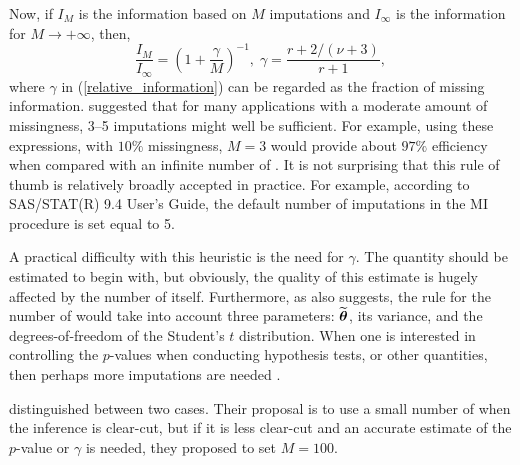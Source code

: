 \documentclass[11pt,a5paper,twoside]{book}
\newcommand{\bftheta}{\mbox{\boldmath $\theta$}}
\begin{document}
Now, if $I_M$ is the information based on $M$ imputations and $I_{\infty}$ is the information for $M\rightarrow+\infty$, then,
\begin{equation}
\label{relative_information}
\frac{I_M}{I_{\infty}} = \left( 1+ \frac{\gamma}{M} \right) ^{-1},\; \gamma=\frac{r+2/(\nu+3)}{r+1},
\end{equation}
where $\gamma$ in (\ref{relative_information}) can be regarded as the fraction of missing information. \cite{rubin1987} suggested that for many applications with a moderate amount of missingness, 3--5 imputations might well be sufficient. For example, using these expressions, with $10\%$ missingness, $M=3$ would provide about $97\%$ efficiency when compared with an infinite number of {\color{black}{imputed datasets}}. It is not surprising that this rule of thumb is relatively broadly accepted in practice. For example, according to SAS/STAT(R) 9.4 User's Guide, the default number of imputations in the MI procedure is set equal to 5.

 {}

A practical difficulty with this heuristic is the need for $\gamma$. 
The quantity should be estimated to begin with, but obviously, the quality of this estimate is hugely affected by the number of {\color{black}{imputed datasets}} itself. Furthermore, as \cite{bodner2008} also suggests, the rule for the number of {\color{black}{imputed datasets}} would take into account three parameters:  $\widetilde{\bftheta}$, its variance, and the degrees-of-freedom of the Student's $t$ distribution. When one is interested in controlling the $p$-values when conducting hypothesis tests, or other quantities, then perhaps more imputations are needed \citep{harel2003,carpenter2008}.

\cite{carpenter2012} distinguished between two cases. Their proposal is to use a small number of {\color{black}{imputed datasets}} when the inference is clear-cut, but if it is less clear-cut and an accurate estimate of the $p$-value or $\gamma$ is needed, they proposed to set $M=100$.
\end{document}
